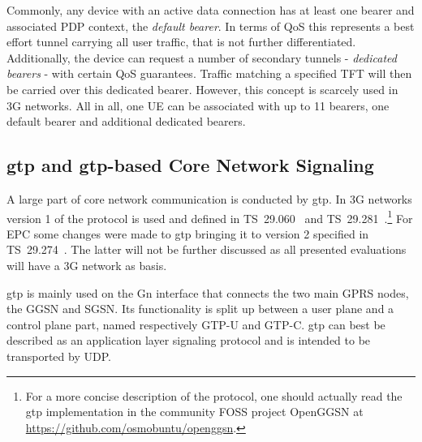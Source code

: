 Commonly, any device with an active data connection has at least one bearer and associated \gls{PDP} context, the \textit{default bearer}. In terms of \gls{QoS} this represents a best effort tunnel carrying all user traffic, that is not further differentiated. Additionally, the device can request a number of secondary tunnels - \textit{dedicated bearers} - with certain \gls{QoS} guarantees. Traffic matching a specified \gls{TFT} will then be carried over this dedicated bearer. However, this concept is scarcely used in \gls{3G} networks. All in all, one \gls{UE} can be associated with up to 11 bearers, one default bearer and additional dedicated bearers.


\subsection{\texorpdfstring{\acrshort{gtp}}{GTP} and \texorpdfstring{\acrshort{gtp}}{GTP}-based Core Network Signaling}
\label{c4:sec:gtp}

A large part of core network communication is conducted by \gls{gtp}. In \gls{3G} networks version 1 of the protocol is used and defined in \gls{TS}~29.060~\cite{3gpp.29.060} and \gls{TS}~29.281~\cite{3gpp.29.281}.\footnote{For a more concise description of the protocol, one should actually read the \gls{gtp} implementation in the community \gls{FOSS} project OpenGGSN at \url{https://github.com/osmobuntu/openggsn}.} For \gls{EPC} some changes were made to \gls{gtp} bringing it to version 2 specified in \gls{TS}~29.274~\cite{3gpp.29.274}. The latter will not be further discussed as all presented evaluations will have a \gls{3G} network as basis.

\gls{gtp} is mainly used on the Gn interface that connects the two main \gls{GPRS} nodes, the \gls{GGSN} and \gls{SGSN}. Its functionality is split up between a user plane and a control plane part, named respectively \gls{GTP-U} and \gls{GTP-C}. \gls{gtp} can best be described as an application layer signaling protocol and is intended to be transported by \gls{UDP}.

